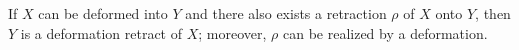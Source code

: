 If $X$ can be deformed into $Y$ and there also exists a retraction $\rho$ of $X$ onto $Y$, then $Y$ is a deformation retract of $X$; moreover, $\rho$ can be realized by a deformation.
